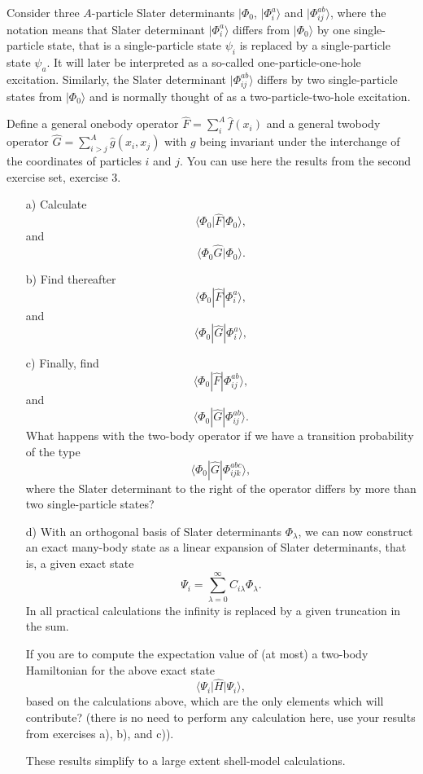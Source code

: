\documentclass[prc]{revtex4}
\begin{document}
Consider three $A$-particle  Slater determinants  $|\Phi_0$, $|\Phi_i^a\rangle$ and $|\Phi_{ij}^{ab}\rangle$, where the notation means that 
Slater determinant $|\Phi_i^a\rangle$ differs from $|\Phi_0\rangle$ by one single-particle state, that is a single-particle
state $\psi_i$ is replaced by a single-particle state $\psi_a$. 
It will later be interpreted as a so-called one-particle-one-hole excitation.
Similarly, the Slater determinant $|\Phi_{ij}^{ab}\rangle$
differs by two single-particle states from $|\Phi_0\rangle$ and is normally thought of as a two-particle-two-hole excitation.

Define a general onebody operator $\hat{F} = \sum_{i}^A\hat{f}(x_{i})$ and a general  twobody operator $\hat{G}=\sum_{i>j}^A\hat{g}(x_{i},x_{j})$ with $g$ being invariant under the interchange of the coordinates of particles $i$ and $j$. You can use here the results from the second exercise set, exercise 3.

\begin{enumerate}
\item[a)]
Calculate
\[
\langle \Phi_0 \vert\hat{F}\vert\Phi_0\rangle,
\]
and
\[
\langle \Phi_0\hat{G}|\Phi_0\rangle.
\]

\item[b)]
Find thereafter 
\[
\langle \Phi_0 |\hat{F}|\Phi_i^a\rangle,
\]
and
\[
\langle \Phi_0|\hat{G}|\Phi_i^a\rangle,
\]

\item[c)]
Finally, find
\[
\langle \Phi_0 |\hat{F}|\Phi_{ij}^{ab}\rangle,
\]
and
\[
\langle \Phi_0|\hat{G}|\Phi_{ij}^{ab}\rangle.
\]
What happens with the two-body operator if we have a transition probability  of the type
\[
\langle \Phi_0|\hat{G}|\Phi_{ijk}^{abc}\rangle,
\]
where the Slater determinant to the right of the operator differs by more than two single-particle states?

\item[d)]
With an orthogonal basis of Slater determinants $\Phi_{\lambda}$, we can now construct an exact many-body state as a linear expansion of Slater determinants, that is, a given exact state
\[
\Psi_i = \sum_{\lambda =0}^{\infty}C_{i\lambda}\Phi_{\lambda}.
\]
In all practical calculations the infinity is replaced by a given truncation in the sum. 

If you are to compute the expectation value of (at most) a two-body Hamiltonian for the above
exact state
\[
\langle \Psi_i \vert \hat{H} \vert \Psi_i\rangle,
\]
based on the calculations above, which are the only elements which will contribute?  (there is no need to perform any calculation here, use your results from exercises a), b), and c)).

These results simplify to a large extent shell-model calculations.
\end{enumerate}
\end{document}
